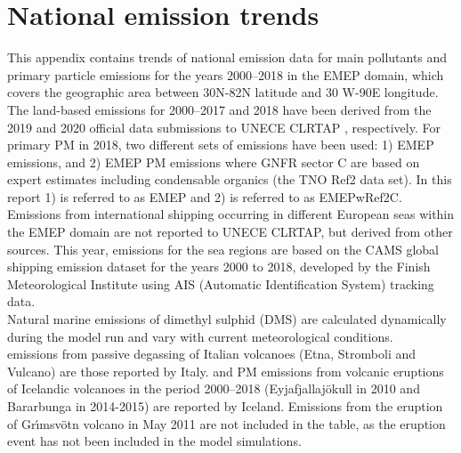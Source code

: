 \setcounter{page}{1}

\cleardoublepage
\chapter[Emission trends]{National emission trends}
\label{ch:appx_emis_trends}


This appendix contains trends of national emission data for main
pollutants and  
primary particle emissions for the years
2000--2018 in the EMEP domain, which covers the geographic area between 30\degrees N-82\degrees N latitude and 30\degrees   
W-90\degrees E longitude.\\

The land-based emissions for 2000--2017 and 2018 have been derived from the 2019
and 2020 official data submissions to UNECE CLRTAP \citep{CEIP2019,CEIP2020}, respectively.
For primary PM in 2018, two different sets of emissions have been used: 1) EMEP emissions, and 2) EMEP PM emissions where GNFR sector C are based on expert estimates including condensable organics (the TNO Ref2 data set). In this report 1) is referred to as EMEP and 2) is referred to as EMEPwRef2C.\\

Emissions from international shipping occurring in different European seas within the EMEP domain are not reported to UNECE CLRTAP, but derived from other sources. This year, emissions for the sea regions are based on the CAMS global shipping emission dataset \citep{CAMSemis2019,ECCAD} for the years 2000 to 2018, developed by the Finish Meteorological Institute using AIS (Automatic Identification System) tracking data.\\

Natural marine emissions of dimethyl sulphid (DMS) are calculated dynamically during the model run and vary with current meteorological conditions.\\

\sox emissions from passive degassing of Italian volcanoes (Etna,
Stromboli and Vulcano) are those reported by
Italy. \sox and PM emissions from volcanic eruptions of Icelandic volcanoes in the period 2000--2018 (Eyjafjallaj\"okull in 2010 and  Bar\dh{}arbunga in 2014-2015) are reported by Iceland. Emissions from the eruption of Gr{\'{\i}}msv{\"{o}}tn volcano in May 2011 are not included in the table, as the eruption event has not been included in the model simulations. \\



